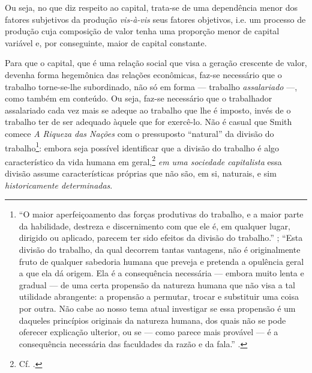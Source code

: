 Ou seja, no que diz respeito ao capital, trata-se de uma dependência menor dos fatores subjetivos da produção \textit{vis-à-vis} seus fatores objetivos, i.e. um processo de produção cuja composição de valor tenha uma proporção menor de capital variável e, por conseguinte, maior de capital constante. 

Para que o capital, que é uma relação social que visa a geração crescente de valor, devenha forma hegemônica das relações econômicas, faz-se necessário que o trabalho torne-se-lhe subordinado, não só em forma --- trabalho \textit{assalariado} ---, como também em conteúdo. Ou seja, faz-se necessário que o trabalhador assalariado cada vez mais se adeque ao trabalho que lhe é imposto, invés de o trabalho ter de ser adequado àquele que for exercê-lo. Não é casual que Smith comece \textit{A Riqueza das Nações} com o pressuposto ``natural'' da divisão do trabalho\footnote{``O maior aperfeiçoamento das forças produtivas do trabalho, e a maior parte da habilidade, destreza e discernimento com que ele é, em qualquer lugar, dirigido ou aplicado, parecem ter sido efeitos da divisão do trabalho.'' \parencite[p. 36]{Smith1904}; ``Esta divisão do trabalho, da qual decorrem tantas vantagens, não é originalmente fruto de qualquer sabedoria humana que preveja e pretenda a opulência geral a que ela dá origem. Ela é a consequência necessária --- embora muito lenta e gradual --- de uma certa propensão da natureza humana que não visa a tal utilidade abrangente: a propensão a permutar, trocar e substituir uma coisa por outra. Não cabe ao nosso tema atual investigar se essa propensão é um daqueles princípios originais da natureza humana, dos quais não se pode oferecer explicação ulterior, ou se --- como parece mais provável --- é a consequência necessária das faculdades da razão e da fala.'' \parencite[p. 42]{Smith1904}.}: embora seja possível identificar que a divisão do trabalho é algo característico da vida humana em geral,\footnote{Cf. \textcite{Lukacs2012, Lukacs2018}.} \textit{em uma sociedade capitalista} essa divisão assume características próprias que não são, em si, naturais, e sim \textit{historicamente determinadas}. 

